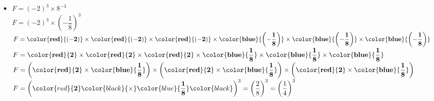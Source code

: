 \begin{corrige}
\begin{itemize}
        \bigskip
        \item $F=(-2)^3\times 8^{-3}$\\
        $F=(-2)^3\times \left(-\dfrac{1}{8}\right)^3$\\
        $F=\mathbf{\color{red}{(-2)}} \times \mathbf{\color{red}{(-2)}}\times \mathbf{\color{red}{(-2)}} \times \mathbf{\color{blue}{\left(-\dfrac{1}{8}\right)}}\times \mathbf{\color{blue}{\left(-\dfrac{1}{8}\right)}}\times \mathbf{\color{blue}{\left(-\dfrac{1}{8}\right)}}$\\
        $F=\mathbf{\color{red}{2}} \times \mathbf{\color{red}{2}}\times \mathbf{\color{red}{2}} \times \mathbf{\color{blue}{\dfrac{1}{8}}}\times \mathbf{\color{blue}{\dfrac{1}{8}}}\times \mathbf{\color{blue}{\dfrac{1}{8}}}$\\
        $F=\left(\mathbf{\color{red}{2}} \times \mathbf{\color{blue}{\dfrac{1}{8}}}\right)\times \left(\mathbf{\color{red}{2}} \times \mathbf{\color{blue}{\dfrac{1}{8}}}\right)\times \left(\mathbf{\color{red}{2}} \times \mathbf{\color{blue}{\dfrac{1}{8}}}\right)$\\
        $F= \left(\color{red}{\mathbf{2}} \color{black}{\times} \color{blue}{\mathbf{\dfrac{1}{8}}}\color{black}\right)^{3}=\left(\dfrac{2}{8}\right)^3=\left(\dfrac{1}{4}\right)^3$
    \end{itemize}
\end{corrige}

